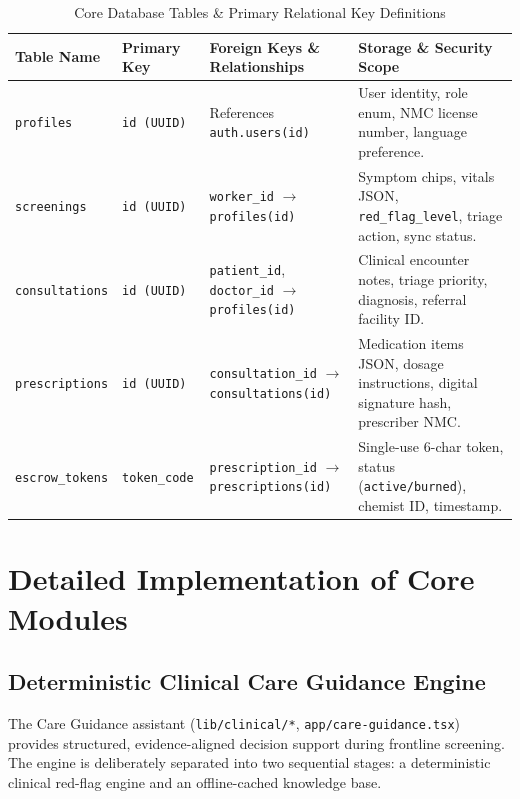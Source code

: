 \documentclass[12pt,a4paper,oneside]{report}
\begin{document}
\begin{table}[H]
\centering
\small
\renewcommand{\arraystretch}{1.08}
\begin{tabularx}{\textwidth}{L{2.2cm} L{1.8cm} Y Y}
\toprule
\textbf{Table Name} & \textbf{Primary Key} & \textbf{Foreign Keys \& Relationships} & \textbf{Storage \& Security Scope} \\
\midrule
\texttt{profiles} & \texttt{id (UUID)} & References \texttt{auth.users(id)} & User identity, role enum, NMC license number, language preference. \\
\texttt{screenings} & \texttt{id (UUID)} & \texttt{worker\_id} $\rightarrow$ \texttt{profiles(id)} & Symptom chips, vitals JSON, \texttt{red\_flag\_level}, triage action, sync status. \\
\texttt{consultations} & \texttt{id (UUID)} & \texttt{patient\_id}, \texttt{doctor\_id} $\rightarrow$ \texttt{profiles(id)} & Clinical encounter notes, triage priority, diagnosis, referral facility ID. \\
\texttt{prescriptions} & \texttt{id (UUID)} & \texttt{consultation\_id} $\rightarrow$ \texttt{consultations(id)} & Medication items JSON, dosage instructions, digital signature hash, prescriber NMC. \\
\texttt{escrow\_tokens} & \texttt{token\_code} & \texttt{prescription\_id} $\rightarrow$ \texttt{prescriptions(id)} & Single-use 6-char token, status (\texttt{active/burned}), chemist ID, timestamp. \\
\bottomrule
\end{tabularx}
\caption{Core Database Tables \& Primary Relational Key Definitions}
\label{tab:db_schema}
\end{table}

\chapter{Detailed Implementation of Core Modules}

\section{Deterministic Clinical Care Guidance Engine}
The Care Guidance assistant (\texttt{lib/clinical/*}, \texttt{app/care-guidance.tsx}) provides structured, evidence-aligned decision support during frontline screening. The engine is deliberately separated into two sequential stages: a deterministic clinical red-flag engine and an offline-cached knowledge base.
\end{document}
